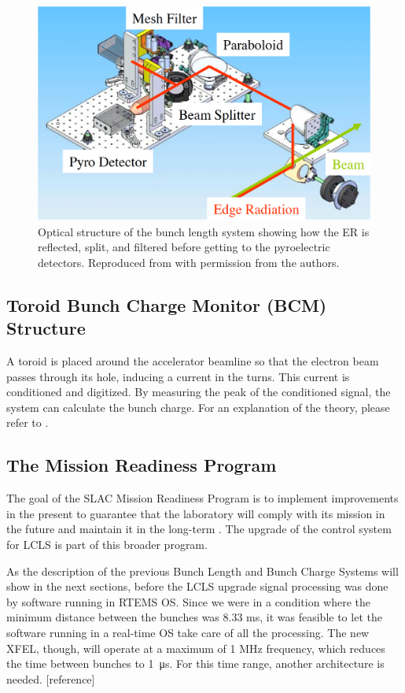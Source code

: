 \documentclass[letter,
        biblatex,   %
        keeplastbox,  %
        ]{jacow}
\begin{document}
\begin{figure}[!htb]
  \centering
  \includegraphics*[width=\columnwidth]{BunchLengthStruct_2}
  \caption{Optical structure of the bunch length system showing how the ER is reflected, split, and filtered before getting to the pyroelectric detectors. Reproduced from \cite{blen-pac07} with permission from the authors.}
  \label{fig:blen_struct2}
\end{figure}

\subsection{Toroid Bunch Charge Monitor (BCM) Structure}
A toroid is placed around the accelerator beamline so that the electron beam passes through its hole, inducing a current in the turns. This current is conditioned and digitized. By measuring the peak of the conditioned signal, the system can calculate the bunch charge. For an explanation of the theory, please refer to \cite{slac-pub-398}.

\subsection{The Mission Readiness Program}
The goal of the SLAC Mission Readiness Program is to implement improvements in the present to guarantee that the laboratory will comply with its mission in the future and maintain it in the long-term \cite{doe-MR}. The upgrade of the control system for LCLS is part of this broader program.

As the description of the previous Bunch Length and Bunch Charge Systems will show in the next sections, before the LCLS upgrade signal processing was done by software running in RTEMS OS. Since we were in a condition where the minimum distance between the bunches was 8.33 ms, it was feasible to let the software running in a real-time OS take care of all the processing. The new XFEL, though, will operate at a maximum of 1 MHz frequency, which reduces the time between bunches to \SI{1}{\micro\second}. For this time range, another architecture is needed. [reference]
\end{document}
